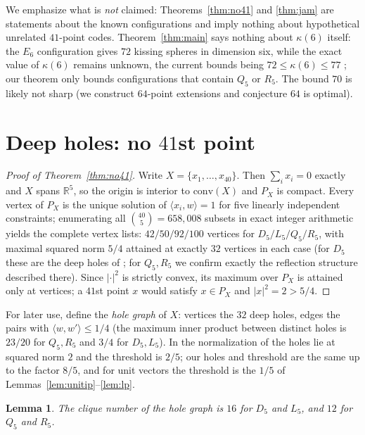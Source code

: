 \documentclass[11pt]{article}
\newtheorem{lemma}[theorem]{Lemma}
\theoremstyle{remark}
\newcommand{\R}{\mathbb{R}}
\newcommand{\ip}[2]{\langle #1,#2\rangle}
\begin{document}
We emphasize what is \emph{not} claimed: Theorems~\ref{thm:no41} and
\ref{thm:jam} are statements about the known configurations and imply
nothing about hypothetical unrelated $41$-point codes. Theorem~\ref{thm:main}
says nothing about $\kappa(6)$ itself: the $E_6$ configuration gives $72$
kissing spheres in dimension six, while the exact value of $\kappa(6)$
remains unknown, the current bounds being $72\le\kappa(6)\le 77$
\cite{dLLdMK2024}; our theorem only bounds configurations that contain
$Q_5$ or $R_5$. The bound $70$ is likely not sharp (we construct
$64$-point extensions and conjecture $64$ is optimal).

\section{Deep holes: no $41$st point}\label{sec:holes}

\begin{proof}[Proof of Theorem~\ref{thm:no41}]
Write $X=\{x_1,\dots,x_{40}\}$. Then $\sum_i x_i=0$ exactly and $X$ spans
$\R^5$, so the origin is interior
to $\mathrm{conv}(X)$ and $P_X$ is compact. Every vertex of $P_X$ is the
unique solution of $\ip{x_i}{w}=1$ for five linearly independent
constraints; enumerating all $\binom{40}{5}=658{,}008$ subsets in exact
integer arithmetic yields the complete vertex lists: $42/50/92/100$
vertices for $D_5/L_5/Q_5/R_5$, with maximal squared norm $5/4$
attained at exactly $32$ vertices in each case (for $D_5$ these are the
deep holes of \cite[\S3]{CR2024}; for $Q_5,R_5$ we confirm exactly the
reflection structure described there). Since $|\cdot|^2$ is strictly
convex, its maximum over $P_X$ is attained only at vertices; a $41$st
point $x$ would satisfy $x\in P_X$ and $|x|^2=2>5/4$.
\end{proof}

For later use, define the \emph{hole graph} of $X$: vertices the $32$
deep holes, edges the pairs with $\ip{w}{w'}\le 1/4$ (the maximum inner
product between distinct holes is $23/20$ for $Q_5,R_5$ and $3/4$ for
$D_5,L_5$). In the normalization of \cite[\S3]{CR2024} the holes lie at
squared norm $2$ and the threshold is $2/5$; our holes and threshold are
the same up to the factor $8/5$, and for unit vectors the threshold is the
$1/5$ of Lemmas~\ref{lem:unitip}--\ref{lem:lp}.

\begin{lemma}\label{lem:holeclique}
The clique number of the hole graph is $16$ for $D_5$ and $L_5$, and
$12$ for $Q_5$ and $R_5$.
\end{lemma}
\end{document}
